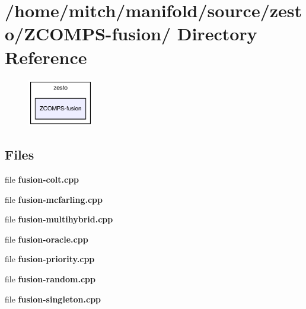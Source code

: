 \section{/home/mitch/manifold/source/zesto/ZCOMPS-fusion/ Directory Reference}
\label{dir_53699732bfcfedf164a190a0882ad320}


\nopagebreak
\begin{figure}[H]
\begin{center}
\leavevmode
\includegraphics[width=81pt]{dir_53699732bfcfedf164a190a0882ad320_dep}
\end{center}
\end{figure}
\subsection*{Files}
\begin{CompactItemize}
\item 
file {\bf fusion-colt.cpp}
\item 
file {\bf fusion-mcfarling.cpp}
\item 
file {\bf fusion-multihybrid.cpp}
\item 
file {\bf fusion-oracle.cpp}
\item 
file {\bf fusion-priority.cpp}
\item 
file {\bf fusion-random.cpp}
\item 
file {\bf fusion-singleton.cpp}
\end{CompactItemize}
